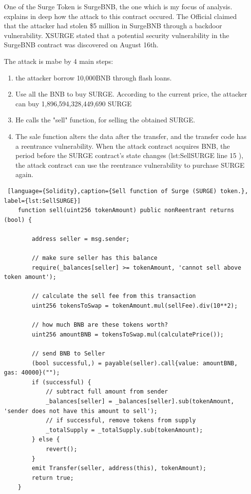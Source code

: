 One of the Surge Token is SurgeBNB, the one which is my focus of analysis.
\citet{XSurgeBNB} explains in deep how the attack to this contract occured. 
The Official claimed that the attacker had stolen \$5 million in SurgeBNB through a backdoor vulnerability.
XSURGE stated that a potential security vulnerability in the SurgeBNB contract was discovered on August 16th.

The attack is mabe by 4 main steps:
\begin{enumerate}
    \item the attacker borrow  10,000BNB through flash loans.
    \item Use all the BNB to buy SURGE. According to the current price, 
    the attacker can buy 1,896,594,328,449,690 SURGE
    \item He calls the "sell" function, for selling the obtained SURGE.
    \item The sale function alters the data after the transfer, and the transfer code has a reentrance vulnerability.
    When the attack contract acquires BNB, the period before the SURGE contract's state changes 
    (\refname{lst:SellSURGE} line 15 ), the attack contract can use the reentrance 
    vulnerability to purchase SURGE again.
\end{enumerate}

\begin{lstlisting} [language={Solidity},caption={Sell function of Surge (SURGE) token.}, label={lst:SellSURGE}]
    function sell(uint256 tokenAmount) public nonReentrant returns (bool) {
        
        address seller = msg.sender;
        
        // make sure seller has this balance
        require(_balances[seller] >= tokenAmount, 'cannot sell above token amount');
        
        // calculate the sell fee from this transaction
        uint256 tokensToSwap = tokenAmount.mul(sellFee).div(10**2);
        
        // how much BNB are these tokens worth?
        uint256 amountBNB = tokensToSwap.mul(calculatePrice());
        
        // send BNB to Seller
        (bool successful,) = payable(seller).call{value: amountBNB, gas: 40000}(""); 
        if (successful) {
            // subtract full amount from sender
            _balances[seller] = _balances[seller].sub(tokenAmount, 'sender does not have this amount to sell');
            // if successful, remove tokens from supply
            _totalSupply = _totalSupply.sub(tokenAmount);
        } else {
            revert();
        }
        emit Transfer(seller, address(this), tokenAmount);
        return true;
    }
\end{lstlisting}


